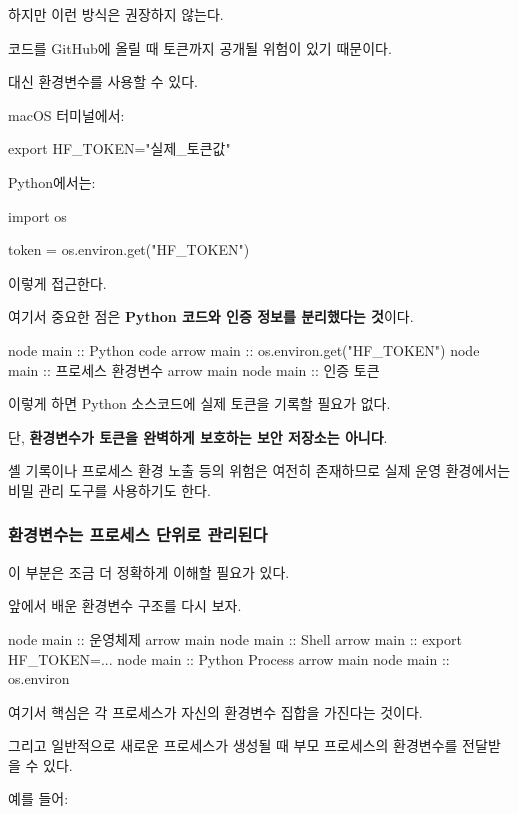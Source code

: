 하지만 이런 방식은 권장하지 않는다.

코드를 GitHub에 올릴 때 토큰까지 공개될 위험이 있기 때문이다.

대신 환경변수를 사용할 수 있다.

macOS 터미널에서:

\begin{dhkzsh}
export HF_TOKEN="실제_토큰값"
\end{dhkzsh}

Python에서는:

\begin{dhkcode}
import os

token = os.environ.get("HF_TOKEN")
\end{dhkcode}

이렇게 접근한다.

여기서 중요한 점은 \textbf{Python 코드와 인증 정보를 분리했다는 것}이다.

\begin{dhkbranch}[in=8]
node main :: Python code
arrow main :: os.environ.get("HF_TOKEN")
node main :: 프로세스 환경변수
arrow main
node main :: 인증 토큰
\end{dhkbranch}

이렇게 하면 Python 소스코드에 실제 토큰을 기록할 필요가 없다.

단, \textbf{환경변수가 토큰을 완벽하게 보호하는 보안 저장소는 아니다}.

셸 기록이나 프로세스 환경 노출 등의 위험은 여전히 존재하므로 실제 운영 환경에서는 비밀 관리 도구를 사용하기도 한다.

\subsubsection{환경변수는 프로세스 단위로 관리된다}

이 부분은 조금 더 정확하게 이해할 필요가 있다.

앞에서 배운 환경변수 구조를 다시 보자.

\begin{dhkbranch}[in=8]
node main :: 운영체제
arrow main
node main :: Shell
arrow main :: export HF_TOKEN=...
node main :: Python Process
arrow main
node main :: os.environ
\end{dhkbranch}

여기서 핵심은 각 프로세스가 자신의 환경변수 집합을 가진다는 것이다.

그리고 일반적으로 새로운 프로세스가 생성될 때 부모 프로세스의 환경변수를 전달받을 수 있다.

예를 들어:

